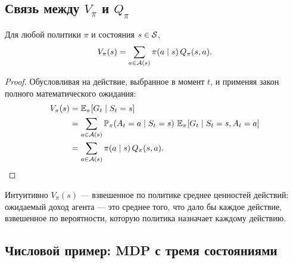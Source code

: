 \subsection*{Связь между $V_\pi$ и $Q_\pi$}

\begin{proposition}
\label{prop:v-q-relation}
Для любой политики $\pi$ и состояния $s \in \mathcal{S}$,
\begin{equation}
\label{eq:v-q-relation}
V_\pi(s) = \sum_{a \in \mathcal{A}(s)} \pi(a \mid s)\, Q_\pi(s, a).
\end{equation}
\end{proposition}

\begin{proof}
Обусловливая на действие, выбранное в момент $t$, и применяя закон полного математического ожидания:
\begin{align*}
V_\pi(s)
&= \operatorname{\mathbb{E}}_\pi[G_t \mid S_t = s] \\
&= \sum_{a \in \mathcal{A}(s)} \mathbb{P}_\pi(A_t = a \mid S_t = s)\,
   \operatorname{\mathbb{E}}_\pi[G_t \mid S_t = s, A_t = a] \\
&= \sum_{a \in \mathcal{A}(s)} \pi(a \mid s)\, Q_\pi(s, a). \qedhere
\end{align*}
\end{proof}

Интуитивно $V_\pi(s)$ — взвешенное по политике среднее ценностей действий: ожидаемый доход агента — это среднее того, что дало бы каждое действие, взвешенное по вероятности, которую политика назначает каждому действию.

\subsection*{Числовой пример: MDP с тремя состояниями}

